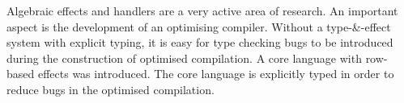 Algebraic effects and handlers are a very active area of research. An important aspect is the development of an optimising compiler. Without a type-\&-effect system with explicit typing, it is easy for type checking bugs to be introduced during the construction of optimised compilation. A core language with row-based effects was introduced. The core language is explicitly typed in order to reduce bugs in the optimised compilation.
